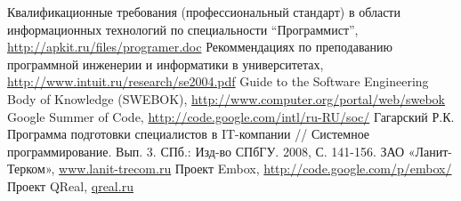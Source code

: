 \documentclass[a5paper]{article}
\begin{document}
\begin{thebibliography}{9001}
   Квалификационные требования (профессиональный стандарт) в области информационных технологий по специальности ``Программист'', \url{http://apkit.ru/files/programer.doc}
   Рекоммендациях по преподаванию программной инженерии и информатики в университетах, \url{http://www.intuit.ru/research/se2004.pdf}
   Guide to the Software Engineering Body of Knowledge (SWEBOK), \url{http://www.computer.org/portal/web/swebok}
   Google Summer of Code, \url{http://code.google.com/intl/ru-RU/soc/}
   Гагарский Р.К. Программа подготовки специалистов в IT-компании // Системное программирование. Вып. 3. СПб.: Изд-во СПбГУ. 2008, С. 141-156.
   ЗАО «Ланит-Терком», \url{www.lanit-trecom.ru}
   Проект Embox, \url{http://code.google.com/p/embox/}
   Проект QReal, \url{qreal.ru}
\end{thebibliography}
\end{document}
